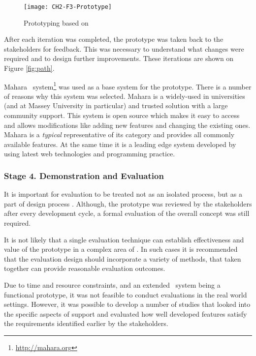 \begin{figure}[htb]
\centering
\texttt{[image: CH2-F3-Prototype]}
\caption[Prototyping]{Prototyping based on \citet*[p.~411]{Sommerville2007}}
\label{fig:prototype}
\end{figure}

After each iteration was completed, the prototype was taken back to the
stakeholders for feedback. This was necessary to understand what changes were
required and to design further improvements. These iterations are shown on
Figure \ref{fig:path}.

Mahara \ep~system\footnote{\url{http://mahara.org}} was used as a base system
for the prototype. There is a number of reasons why this system was selected.
Mahara is a widely-used in universities (and at Massey University in particular)
and trusted solution with a large community support. This system is open source
which makes it easy to access and allows modifications like adding new features
and changing the existing ones. Mahara is a \textit{typical} representative of
its category and provides all commonly available features. At the same time it
is a leading edge system developed by using latest web technologies and
programming practice.

\subsubsection{Stage 4. Demonstration and Evaluation}

It is important for evaluation to be treated not as an isolated process, but as
a part of design process \citep{Cleven2009}. Although, the prototype was
reviewed by the stakeholders after every development cycle, a formal evaluation
of the overall concept was still required.

It is not likely that a single evaluation technique can establish effectiveness
and value of the prototype in a complex area of \LLLsn. In such cases it is
recommended \citep{Quinlan2008} that the evaluation design should incorporate a
variety of methods, that taken together can provide reasonable evaluation
outcomes.

Due to time and resource constraints, and an extended \ep~system being a
functional prototype, it was not feasible to conduct evaluations in the real
world settings. However, it was possible to develop a number of studies that
looked into the specific aspects of \LLLs support and evaluated how well
developed features satisfy the requirements identified earlier by the
stakeholders.
 
